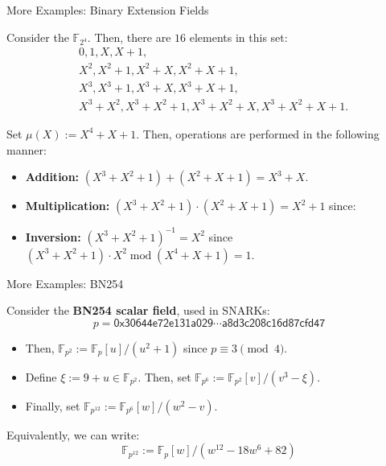 \documentclass{zkdl-presentation-template}
\begin{document}
    \begin{frame}{More Examples: Binary Extension Fields}
        \begin{example}
            Consider the $\mathbb{F}_{2^4}$. Then, there are $16$ elements in this set:
            \begin{equation*}
                \begin{aligned}
                    &0, 1, X, X+1,\\ &X^2, X^2+1, X^2+X, X^2+X+1,\\
                    &X^3, X^3+1, X^3+X, X^3+X+1,\\ &X^3+X^2, X^3+X^2+1, X^3+X^2+X, X^3+X^2+X+1.
                \end{aligned}
            \end{equation*}
        
            Set $\mu(X):=X^4+X+1$. Then, operations are performed in the following manner:
            \begin{itemize}
                \item \textbf{Addition:} $(X^3+X^2+1)+(X^2+X+1) = X^3+X$.
                \item \textbf{Multiplication:} $(X^3+X^2+1)\cdot(X^2+X+1)=X^2+1$ since:
                \item \textbf{Inversion:} $(X^3+X^2+1)^{-1}=X^2$ since $(X^3+X^2+1)\cdot X^2 \; \text{mod} \; (X^4+X+1) = 1$.
            \end{itemize}
        \end{example}
    \end{frame}

    \begin{frame}{More Examples: BN254}
        \begin{example}
            Consider the \textbf{BN254 scalar field}, used in SNARKs:
            \begin{equation*}
                p = \mathsf{0x30644e72e131a029\cdots a8d3c208c16d87cfd47}
            \end{equation*}
            \begin{itemize}
                \item Then, $\mathbb{F}_{p^2} := \mathbb{F}_p[u]/(u^2+1)$ since $p \equiv 3 \pmod{4}$.
                \item Define $\xi := 9+u \in \mathbb{F}_{p^2}$. Then, set $\mathbb{F}_{p^6}:=\mathbb{F}_{p^2}[v]/(v^3-\xi)$.
                \item Finally, set $\mathbb{F}_{p^{12}} := \mathbb{F}_{p^6}[w]/(w^2-v)$.
            \end{itemize}

            Equivalently, we can write:
            \begin{equation*}
                \mathbb{F}_{p^{12}} := \mathbb{F}_p[w]/(w^{12}-18w^6+82)
            \end{equation*}
        \end{example}
    \end{frame}
\end{document}
